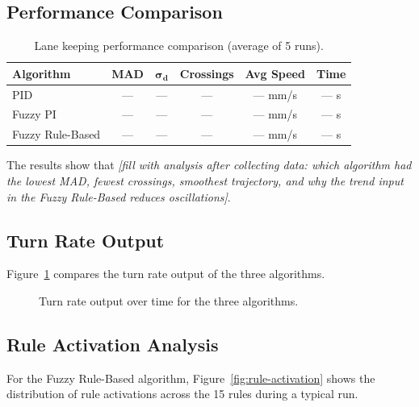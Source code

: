 \subsection{Performance Comparison}

\begin{table}[htbp]
\centering
\caption{Lane keeping performance comparison (average of 5 runs).}
\label{tab:lk-performance}
\begin{tabular}{l c c c c c}
\hline
\textbf{Algorithm} & \textbf{MAD} & $\boldsymbol{\sigma_d}$ & \textbf{Crossings} & \textbf{Avg Speed} & \textbf{Time} \\
\hline
PID             & --- & --- & --- & --- mm/s & --- s \\
Fuzzy PI        & --- & --- & --- & --- mm/s & --- s \\
Fuzzy Rule-Based & --- & --- & --- & --- mm/s & --- s \\
\hline
\end{tabular}
\end{table}

The results show that \textit{[fill with analysis after collecting data: which algorithm had the lowest MAD, fewest crossings, smoothest trajectory, and why the trend input in the Fuzzy Rule-Based reduces oscillations]}.


\subsection{Turn Rate Output}

Figure~\ref{fig:lk-output} compares the turn rate output of the three algorithms.

\begin{figure}[htbp]
    \centering
    \caption{Turn rate output over time for the three algorithms.}
    \label{fig:lk-output}
\end{figure}

\subsection{Rule Activation Analysis}

For the Fuzzy Rule-Based algorithm, Figure~\ref{fig:rule-activation} shows the distribution of rule activations across the 15 rules during a typical run.

